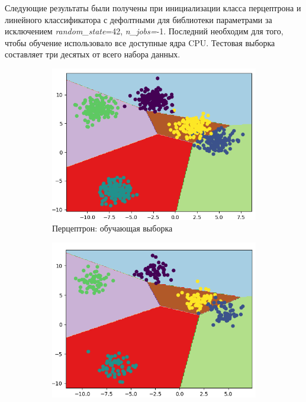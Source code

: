 Следующие результаты были получены при инициализации класса перцептрона и линейного классификатора с дефолтными для библиотеки параметрами за исключением \textit{random\_state}=42, \textit{n\_jobs=}-1. Последний необходим для того, чтобы обучение использовало все доступные ядра CPU. Тестовая выборка составляет три десятых от всего набора данных. 

\begin{figure}[h]
	\centering
	\begin{subfigure}{0.49\linewidth}
		\includegraphics[width=\linewidth]{images/perceptron_train_blobs}
		\caption{Перцептрон: обучающая выборка}
	\end{subfigure}
	\begin{subfigure}{0.49\linewidth}
		\includegraphics[width=\linewidth]{images/perceptron_test_blobs}

\end{subfigure}
\end{figure}

